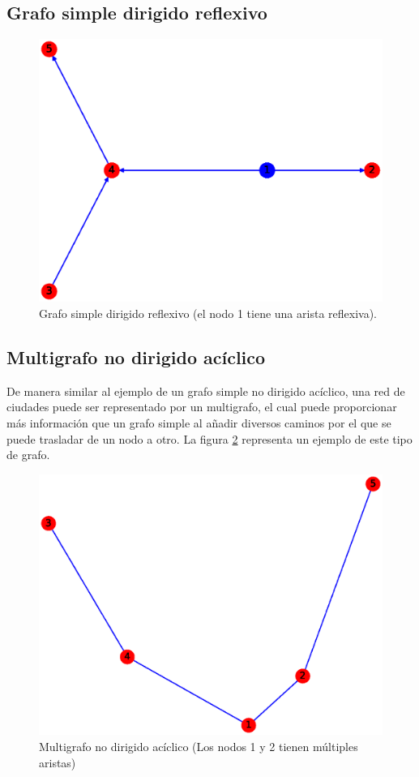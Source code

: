 \documentclass{article}
\begin{document}
\subsection{Grafo simple dirigido reflexivo}
\begin{figure}[H]
    \includegraphics[width=\textwidth]{6-GSDR}
    \caption{Grafo simple dirigido reflexivo (el nodo 1 tiene una arista reflexiva).}
    \label{fig:GSDR}
\end{figure}


\subsection{Multigrafo no dirigido acíclico}
De manera similar al ejemplo de un grafo simple no dirigido acíclico, una red de ciudades puede ser representado por un multigrafo, el cual puede proporcionar más información que un grafo simple al añadir diversos caminos por el que se puede trasladar de un nodo a otro. La figura \ref{fig:MNDA} representa un ejemplo de este tipo de grafo.
\begin{figure}[H]
    \includegraphics[width=\textwidth]{7-MNDA}
    \caption{Multigrafo no dirigido acíclico (Los nodos 1 y 2 tienen múltiples aristas)}
    \label{fig:MNDA}
\end{figure}
\end{document}
